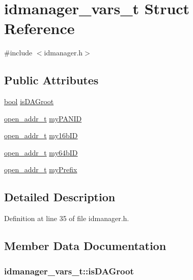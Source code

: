 \hypertarget{structidmanager__vars__t}{}\section{idmanager\+\_\+vars\+\_\+t Struct Reference}
\label{structidmanager__vars__t}


{\ttfamily \#include $<$idmanager.\+h$>$}

\subsection*{Public Attributes}
\begin{DoxyCompactItemize}
\item 
\hyperlink{_p_e___types_8h_a97a80ca1602ebf2303258971a2c938e2}{bool} \hyperlink{structidmanager__vars__t_a6c892e7b83d5f18e42934f543826bfb9}{is\+D\+A\+Groot}
\item 
\hyperlink{structopen__addr__t}{open\+\_\+addr\+\_\+t} \hyperlink{structidmanager__vars__t_a6c3e789d5caf992de247b3578104360e}{my\+P\+A\+N\+ID}
\item 
\hyperlink{structopen__addr__t}{open\+\_\+addr\+\_\+t} \hyperlink{structidmanager__vars__t_aedcac2dd9f6a5a8d0edfca6a861a3eef}{my16b\+ID}
\item 
\hyperlink{structopen__addr__t}{open\+\_\+addr\+\_\+t} \hyperlink{structidmanager__vars__t_a41c964b52056d4022c136419ab5d0704}{my64b\+ID}
\item 
\hyperlink{structopen__addr__t}{open\+\_\+addr\+\_\+t} \hyperlink{structidmanager__vars__t_ad563fc083ecc8c561374241382e76c89}{my\+Prefix}
\end{DoxyCompactItemize}


\subsection{Detailed Description}


Definition at line 35 of file idmanager.\+h.



\subsection{Member Data Documentation}
\subsubsection[{\texorpdfstring{is\+D\+A\+Groot}{isDAGroot}}]{ idmanager\+\_\+vars\+\_\+t\+::is\+D\+A\+Groot}\hypertarget{structidmanager__vars__t_a6c892e7b83d5f18e42934f543826bfb9}{}\label{structidmanager__vars__t_a6c892e7b83d5f18e42934f543826bfb9}


